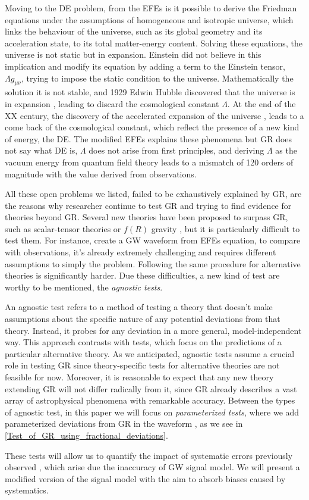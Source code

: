 Moving to the DE problem, from the EFEs is it possible to derive the Friedman equations under the assumptions of homogeneous and isotropic universe, which links the behaviour of the universe, such as its global geometry and its acceleration state, to its total matter-energy content. Solving these equations, the universe is not static but in expansion. Einstein did not believe in this implication and modify its equation by adding a term to the Einstein tensor, $ \Lambda g_{\mu\nu} $, trying to impose the static condition to the universe. Mathematically the solution it is not stable, and 1929 Edwin Hubble discovered that the universe is in expansion \cite{bagla2009hubblehubbleslawexpanding}, leading to discard the cosmological constant $ \Lambda$. At the end of the XX century, the discovery of the accelerated expansion of the universe \cite{Huterer_2017}, leads to a come back of the cosmological constant, which reflect the presence of a new kind of energy, the DE. The modified EFEs explains these phenomena but GR does not say what DE is, $\Lambda$ does not arise from first principles, and deriving $\Lambda$ as the vacuum energy from quantum field theory leads to a mismatch of 120 orders of magnitude with the value derived from observations.

All these open problems we listed, failed to be exhaustively explained by GR, are the reasons why researcher continue to test GR and trying to find evidence for theories beyond GR. Several new theories have been proposed to surpass GR, such as scalar-tensor theories or $f(R)$ gravity \cite{Naruko_2016, Sotiriou_2010}, but it is particularly difficult to test them. For instance, create a GW waveform from EFEs equation, to compare with observations, it's already extremely challenging and requires different assumptions to simply the problem. Following the same procedure for alternative theories is significantly harder. Due these difficulties, a new kind of test are worthy to be mentioned, the \textit{agnostic tests}.

An agnostic test refers to a method of testing a theory that doesn't make assumptions about the specific nature of any potential deviations from that theory. Instead, it probes for any deviation in a more general, model-independent way. This approach contrasts with  tests, which focus on the predictions of a particular alternative theory. As we anticipated, agnostic tests assume a crucial role in testing GR since theory-specific tests for alternative theories are not feasible for now. Moreover, it is reasonable to expect that any new theory extending GR will not differ radically from it, since GR already describes a vast array of astrophysical phenomena with remarkable accuracy. Between the types of agnostic test, in this paper we will focus on \textit{parameterized tests}, where we add parameterized deviations from GR in the waveform \cite{Carson_2021}, as we see in \ref{Test_of_GR_using_fractional_deviations}.

These tests will allow us to quantify the impact of systematic errors previously observed \cite{toubiana2024measuringsourcepropertiesquasinormalmode}, which arise due the inaccuracy of GW signal model. We will present a modified version of the signal model with the aim to absorb biases caused by systematics.
